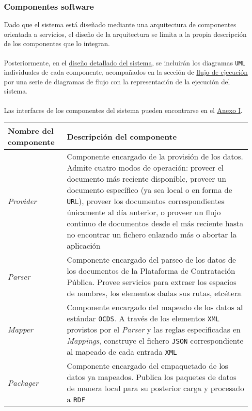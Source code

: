        \subsubsection{Componentes software} \label{subsubsec:componentes}
            Dado que el sistema está diseñado mediante una arquitectura de componentes orientada a servicios, el diseño de la arquitectura se limita a la propia descripción de los componentes que lo integran.
            \\ \\
            Posteriormente, en el \hyperref[subsec:detallado]{diseño detallado del sistema}, se incluirán los diagramas \texttt{UML} individuales de cada componente, acompañados en la sección de \hyperref[subsec:flujo]{flujo de ejecución} por una serie de diagramas de flujo con la representación de la ejecución del sistema.
            \\ \\
            Las interfaces de los componentes del sistema pueden encontrarse en el \hyperref[annex:interfaces]{Anexo I}.
            
            \begin{center}
                \begin{tabular}{|| M{3cm} | M{12cm} ||} 
                    \hline
                        Nombre del componente & Descripción del componente \\
                    \hline\hline
                        \textit{\large Provider} & Componente encargado de la provisión de los datos. Admite cuatro modos de operación: proveer el documento más reciente disponible, proveer un documento específico (ya sea local o en forma de \texttt{URL}), proveer los documentos correspondientes únicamente al día anterior, o proveer un flujo continuo de documentos desde el más reciente hasta no encontrar un fichero enlazado más o abortar la aplicación \\ 
                    \hline
                        \textit{\large Parser} & Componente encargado del parseo de los datos de los documentos de la Plataforma de Contratación Pública. Provee servicios para extraer los espacios de nombres, los elementos dadas sus rutas, etcétera  \\
                    \hline
                        \textit{\large Mapper} & Componente encargado del mapeado de los datos al estándar \texttt{OCDS}. A través de los elementos \texttt{XML} provistos por el \textit{Parser} y las reglas especificadas en \textit{Mappings}, construye el fichero \texttt{JSON} correspondiente al mapeado de cada entrada \texttt{XML} \\
                    \hline
                        \textit{\large Packager} & Componente encargado del empaquetado de los datos ya mapeados. Publica los paquetes de datos de manera local para su posterior carga y procesado a \texttt{RDF} \\
                    \hline
                \end{tabular}
            \end{center}
            

